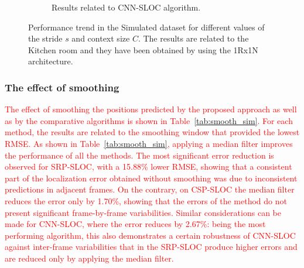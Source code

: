 \documentclass[review]{elsarticle}
\newcommand{\tableref}[1]{Table~\ref{#1}}
\begin{document}
\begin{figure}[t]
\begin{subfigure}{0.45\columnwidth}
%
	\caption{Results related to CNN-SLOC algorithm.}
		\end{subfigure}
	\caption{Performance trend in the Simulated dataset for different values of the stride $s$ and context size $C$. The results are related to the Kitchen room and they have been obtained by using the 1Rx1N architecture.}\label{sfig:cnn-real-context}
	\label{ctx-str-SIMU}
\end{figure}


\subsubsection{The effect of smoothing}
\textcolor{red}{
The effect of smoothing the positions predicted by the proposed approach as well as by the comparative algorithms is shown in \tableref{tab:smooth_sim}. For each method, the results are related to the smoothing window that provided the lowest RMSE. As shown in \tableref{tab:smooth_sim}, applying a median filter improves the performance of all the methods. The most significant error reduction is observed for SRP-SLOC, with a 15.88\% lower RMSE, showing that a consistent part of the localization error obtained without smoothing was due to inconsistent predictions in adjacent frames. On the contrary, on CSP-SLOC the median filter reduces the error only by 1.70\%, showing that the errors of the method do not present significant frame-by-frame variabilities. Similar considerations can be made for CNN-SLOC, where the error reduces by 2.67\%: being the most performing algorithm, this also demonstrates a certain robustness of CNN-SLOC against inter-frame variabilities that in the SRP-SLOC produce higher errors and are reduced only by applying the median filter.}
\end{document}
